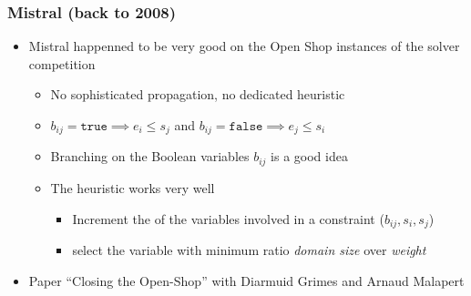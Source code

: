 \begin{frame}
\frametitle{Mistral (back to 2008)}

\pause
\begin{itemize}
  \item Mistral happenned to be very good on the Open Shop instances of the solver competition

  \vfill\pause
  \begin{itemize}
     \item No sophisticated propagation, no dedicated heuristic

     \vfill
     \item {} $b_{ij} = \texttt{true} \implies e_i \leq s_j$ and $b_{ij} = \texttt{false} \implies e_j \leq s_i$
   \end{itemize} 

   \vfill\pause
   \begin{itemize}
     \item Branching on the Boolean variables $b_{ij}$ is a good idea

     \vfill
     \item The  heuristic works very well

     \vfill
     \begin{itemize}
       \item Increment the  of the variables involved in a  constraint ($b_{ij},s_i,s_j$)

       \vfill
       \item select the variable with minimum ratio \emph{domain size} over \emph{weight}
     \end{itemize}
   \end{itemize}

   \vfill\pause
   \item Paper ``Closing the Open-Shop'' with Diarmuid Grimes and Arnaud Malapert
\end{itemize}

\end{frame}


